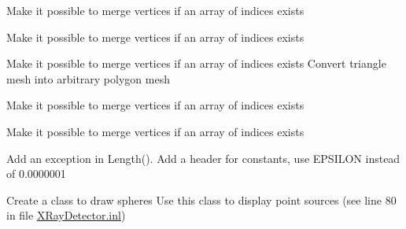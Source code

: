 \label{todo__todo000001}
\hypertarget{todo__todo000001}{}
 
\begin{DoxyDescription}
\item[File \hyperlink{_cube_mesh_8h}{CubeMesh.h} ]Make it possible to merge vertices if an array of indices exists
\end{DoxyDescription}

\label{todo__todo000002}
\hypertarget{todo__todo000002}{}
 
\begin{DoxyDescription}
\item[File \hyperlink{_cube_mesh_8inl}{CubeMesh.inl} ]Make it possible to merge vertices if an array of indices exists
\end{DoxyDescription}

\label{todo__todo000003}
\hypertarget{todo__todo000003}{}
 
\begin{DoxyDescription}
\item[File \hyperlink{_polygon_mesh_8h}{PolygonMesh.h} ]Make it possible to merge vertices if an array of indices exists Convert triangle mesh into arbitrary polygon mesh
\end{DoxyDescription}

\label{todo__todo000004}
\hypertarget{todo__todo000004}{}
 
\begin{DoxyDescription}
\item[File \hyperlink{_sphere_mesh_8h}{SphereMesh.h} ]Make it possible to merge vertices if an array of indices exists
\end{DoxyDescription}

\label{todo__todo000005}
\hypertarget{todo__todo000005}{}
 
\begin{DoxyDescription}
\item[File \hyperlink{_sphere_mesh_8inl}{SphereMesh.inl} ]Make it possible to merge vertices if an array of indices exists
\end{DoxyDescription}

\label{todo__todo000006}
\hypertarget{todo__todo000006}{}
 
\begin{DoxyDescription}
\item[File \hyperlink{_vec3_8h}{Vec3.h} ]Add an exception in Length(). Add a header for constants, use EPSILON instead of 0.0000001
\end{DoxyDescription}

\label{todo__todo000007}
\hypertarget{todo__todo000007}{}
 
\begin{DoxyDescription}
\item[File \hyperlink{_x_ray_detector_8h}{XRayDetector.h} ]Create a class to draw spheres Use this class to display point sources (see line 80 in file \hyperlink{_x_ray_detector_8inl}{XRayDetector.inl})
\end{DoxyDescription}